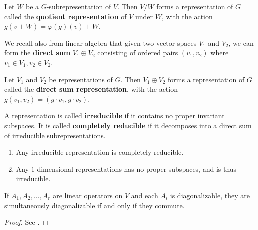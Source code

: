 \begin{defn}
Let $W$ be a $G$-subrepresentation of $V$.  Then $V/W$ forms a representation of $G$ called the \textbf{quotient representation} of $V$ under $W$, with the action $g( v + W) = \varphi(g)(v) + W$.
\end{defn}

We recall also from linear algebra that given two vector spaces $V_1$ and $V_2$, we can form the \textbf{direct sum} $V_1 \oplus V_2$ consisting of ordered pairs $(v_1 ,v_2)$ where $v_1 \in V_1, v_2 \in V_2$.  

\begin{defn}
Let $V_1$ and $V_2$ be representations of $G$.  Then $V_1 \oplus V_2$ forms a representation of $G$ called the \textbf{direct sum representation}, with the action $g (v_1, v_2) = (g \cdot  v_1, g \cdot v_2)$.
\end{defn}


\begin{defn}
A representation is called \textbf{irreducible} if it contains no proper invariant subspaces.  It is called \textbf{completely reducible} if it decomposes into a direct sum of irreducible subrepresentations.
\end{defn}

\begin{example}
\begin{enumerate}
\item Any irreducible representation is completely reducible.
\item Any $1$-dimensional representations has no proper subspaces, and is thus irreducible.
\end{enumerate}
\end{example}

\begin{thm}\label{simultaneous} If $A_1, A_2, \ldots, A_r$ are linear operators on $V$ and each $A_i$ is diagonalizable, they are simultaneously diagonalizable if and only if they commute.
\end{thm}
\begin{proof}
 See \cite[Theorem 5.1] {ConradMinPoly}.
\end{proof}


